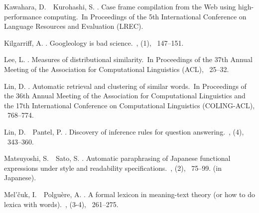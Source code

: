 \documentclass[english]{jnlp_1.4}
\begin{document}
\begin{thebibliography}{}
Kawahara, D.\BBACOMMA\ \BBA\ Kurohashi, S. \BBCP.
\newblock \BBOQ Case frame compilation from the {Web} using high-performance
  computing.\BBCQ\
\newblock In {\Bem Proceedings of the 5th International Conference on Language
  Resources and Evaluation {\rm (}LREC\/{\rm )}}.

Kilgarriff, A. \BBCP.
\newblock \BBOQ Googleology is bad science.\BBCQ\
, {}  (1), \mbox{\BPGS\
  147--151}.

\bibitem[\protect\BCAY{Lee}{Lee}{1999}]{lee:99:a}
Lee, L. \BBOP 1999\BBCP.
\newblock \BBOQ Measures of distributional similarity.\BBCQ\
\newblock In {\Bem Proceedings of the 37th Annual Meeting of the Association
  for Computational Linguistics {\rm (}ACL\/{\rm )}}, \mbox{\BPGS\ 25--32}.

Lin, D. \BBOP 1998\BBCP.
\newblock \BBOQ Automatic retrieval and clustering of similar words.\BBCQ\
\newblock In {\Bem Proceedings of the 36th Annual Meeting of the Association
  for Computational Linguistics and the 17th International Conference on
  Computational Linguistics {\rm (}COLING-ACL\/{\rm )}}, \mbox{\BPGS\
  768--774}.

Lin, D.\BBACOMMA\ \BBA\ Pantel, P. \BBOP 2001\BBCP.
\newblock \BBOQ Discovery of inference rules for question answering.\BBCQ\
, {}  (4), \mbox{\BPGS\
  343--360}.

Matsuyoshi, S.\BBACOMMA\ \BBA\ Sato, S. \BBCP.
\newblock \BBOQ Automatic paraphrasing of {Japanese} functional expressions
  under style and readability specifications.\BBCQ\
, {}  (2),
  \mbox{\BPGS\ 75--99}.
\newblock (in Japanese).

Mel'\v{c}uk, I.\BBACOMMA\ \BBA\ Polgu\`{e}re, A. \BBCP.
\newblock \BBOQ A formal lexicon in meaning-text theory (or how to do lexica
  with words).\BBCQ\
, {}  (3-4), \mbox{\BPGS\
  261--275}.


\end{thebibliography}
\end{document}
